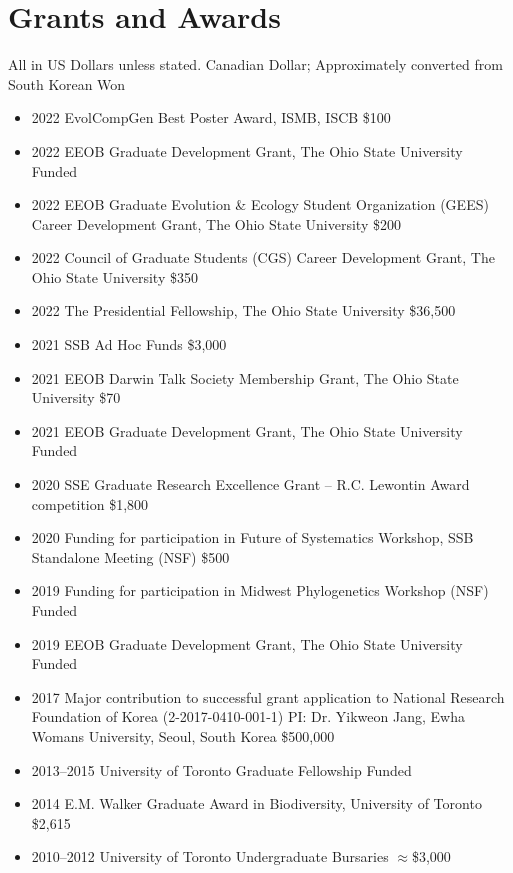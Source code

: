 \documentclass[11pt,letterpaper,sans]{moderncv} %
\begin{document}
\section{Grants and Awards}
All in US Dollars unless stated. \dag Canadian Dollar; \ddag Approximately converted from South Korean Won 

\begin{itemize}
	\item 2022 	EvolCompGen Best Poster Award, ISMB, ISCB	\$100
	\item 2022 	EEOB Graduate Development Grant, The Ohio State University	Funded
	\item 2022 	EEOB Graduate Evolution \& Ecology Student Organization (GEES) Career Development Grant, The Ohio State University \$200
	\item 2022  	Council of Graduate Students (CGS) Career Development Grant, The Ohio State University \$350
	\item 2022 	The Presidential Fellowship, The Ohio State University \$36,500
	\item 2021 	SSB Ad Hoc Funds	\$3,000
	\item 2021 	EEOB Darwin Talk Society Membership Grant, The Ohio State University	\$70
	\item 2021 	EEOB Graduate Development Grant, The Ohio State University	Funded
	\item 2020 	SSE Graduate Research Excellence Grant – R.C. Lewontin Award competition	\$1,800
	\item 2020 	Funding for participation in Future of Systematics Workshop, SSB Standalone Meeting (NSF)	\$500
	\item 2019 	Funding for participation in Midwest Phylogenetics Workshop (NSF)	Funded
	\item 2019 	EEOB Graduate Development Grant, The Ohio State University	Funded
	\item 2017 	Major contribution to successful grant application to 	National Research Foundation of Korea (2-2017-0410-001-1) PI: Dr. Yikweon Jang, Ewha Womans University, Seoul, South Korea	 \ddag\$500,000
	\item 2013--2015  University of Toronto Graduate Fellowship	 Funded
	\item 2014 	E.M. Walker Graduate Award in Biodiversity, University of Toronto	\dag\$2,615
	\item 2010--2012 	University of Toronto Undergraduate Bursaries	 \dag$\approx$\$3,000
\end{itemize}
\end{document}
